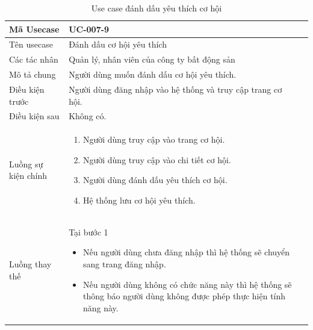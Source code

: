 \documentclass[12pt,a4paper]{article}
\begin{document}
    \begin{table}[H]
        \centering
        \begin{tabular}{|p{3.5cm}|p{11.5cm}|c|}
            \hline
            Mã Usecase      & UC-007-9                                                    \\
            \hline
            Tên usecase     & Đánh dấu cơ hội yêu thích                                   \\
            \hline
            Các tác nhân    & Quản lý, nhân viên của công ty bất động sản                 \\
            \hline
            Mô tả chung     & Người dùng muốn đánh dấu cơ hội yêu thích.                  \\
            \hline

            Điều kiện trước & Người dùng đăng nhập vào hệ thống và truy cập trang cơ hội. \\
            \hline

            Điều kiện sau   & Không có.                                                   \\
            \hline

            Luồng sự kiện chính & \vspace{-.8cm}\begin{enumerate}
                                                    \item Người dùng truy cập vào trang cơ hội.
                                                    \item Người dùng truy cập vào chi tiết cơ hội.
                                                    \item Người dùng đánh dấu yêu thích cơ hội.
                                                    \item Hệ thống lưu cơ hội yêu thích.
            \end{enumerate}
            \\
            \hline
            Luồng thay thế & Tại bước 1\newline
            \vspace{-.8cm}\begin{itemize}
                              \item Nếu người dùng chưa đăng nhập thì hệ thống sẽ chuyển sang trang đăng nhập.
                              \item Nếu người dùng không có chức năng này thì hệ thống sẽ thông báo người dùng không được phép thực hiện tính năng này.
            \end{itemize}
            \\ \hline
        \end{tabular}
        \caption{Use case đánh dấu yêu thích cơ hội}

    \end{table}
\end{document}
